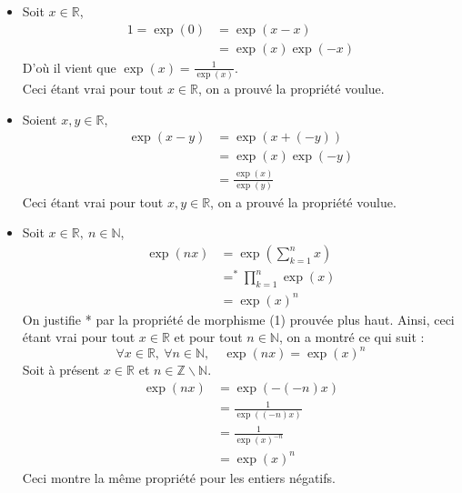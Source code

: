 \documentclass[10pt]{article}
\begin{document}
    \begin{itemize}
        \item Soit $x\in\mathbb{R}$,
        \begin{align*}
            1=\exp(0)&=\exp(x-x)\\
                     &=\exp(x)\exp(-x)
        \end{align*}
        D'où il vient que $\exp(x)=\frac1{\exp(x)}$.\\
        Ceci étant vrai pour tout $x\in\mathbb{R}$, on a prouvé la propriété voulue.
        \item Soient $x,y\in\mathbb{R}$,
        \begin{align*}
            \exp(x-y)&=\exp(x+(-y))\\
                     &=\exp(x)\exp(-y)\\
                     &=\frac{\exp(x)}{\exp(y)}
        \end{align*}
        Ceci étant vrai pour tout $x,y\in\mathbb{R}$, on a prouvé la propriété voulue.
        \item Soit $x\in\mathbb{R},\ n\in\mathbb{N}$,\
        \begin{align*}
            \exp(nx)&=\exp\left(\sum_{k=1}^nx\right)\\
                    &=^*\prod_{k=1}^n\exp(x)\\
                    &=\exp(x)^n
        \end{align*}
        On justifie * par la propriété de morphisme (1) prouvée plus haut.
        Ainsi, ceci étant vrai pour tout $x\in\mathbb{R}$ et pour tout $n\in\mathbb{N}$, on a montré ce qui suit : 
        \begin{equation*}
            \forall x\in\mathbb{R},\ \forall n\in\mathbb{N},\quad \exp(nx)=\exp(x)^n
        \end{equation*}
        Soit à présent $x\in\mathbb{R}$ et $n\in\mathbb{Z}\backslash\mathbb{N}$.
        \begin{align*}
            \exp(nx)&=\exp(-(-n)x)\\
                    &=\frac1{\exp((-n)x)}\\
                    &=\frac1{\exp(x)^{-n}}\\
                    &=\exp(x)^n
        \end{align*}
        Ceci montre la même propriété pour les entiers négatifs.
    \end{itemize}
\end{document}
